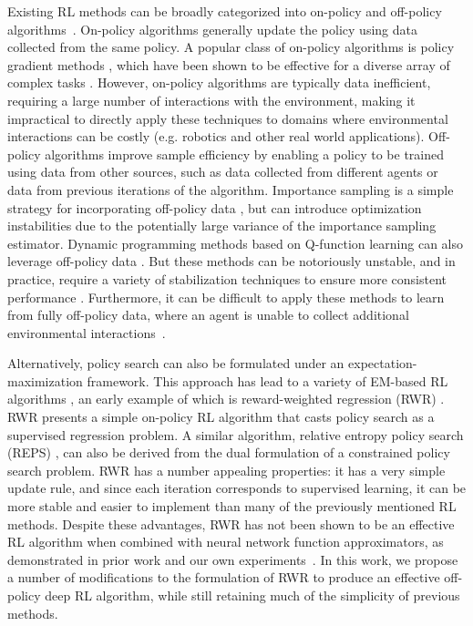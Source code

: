 \documentclass{article} \usepackage{iclr2020_conference,times}
\begin{document}
Existing RL methods can be broadly categorized into on-policy and off-policy algorithms~\citep{Sutton1998}. On-policy algorithms generally update the policy using data collected from the same policy. A popular class of on-policy algorithms is policy gradient methods \citep{Williams1992,PoliGrad1999}, which have been shown to be effective for a diverse array of complex tasks \citep{HeessTSLMWTEWER17,Pathak2017,2018-TOG-deepMimic,Rajeswaran-RSS-18}.
However, on-policy algorithms are typically data inefficient, requiring a large number of interactions with the environment, making it impractical to directly apply these techniques to domains where environmental interactions can be costly (e.g. robotics and other real world applications).
Off-policy algorithms improve sample efficiency by enabling a policy to be trained using data from other sources, such as data collected from different agents or data from previous iterations of the algorithm. Importance sampling is a simple strategy for incorporating off-policy data \citep{Sutton1998,Meuleau00off,Hachiya2009}, but can introduce optimization instabilities due to the potentially large variance of the importance sampling estimator. Dynamic programming methods based on Q-function learning can also leverage off-policy data \citep{Precup2001,mnih2015humanlevel,DDPG2016,NAF16,haarnoja18b}. But these methods can be notoriously unstable, and in practice, require a variety of stabilization techniques to ensure more consistent performance \citep{Hasselt2016,WangBHMMKF16,Munos2016,RainbowDQN2017,fujimoto18a,nachum2018learning,fu19diagnosing}. Furthermore, it can be difficult to apply these methods to learn from fully off-policy data, where an agent is unable to collect additional environmental interactions~\citep{fujimoto19offpolicy, BEAR2019}.

Alternatively, policy search can also be formulated under an expectation-maximization framework. This approach has lead to a variety of EM-based RL algorithms \citep{Peters2010REP,Neumann2011,abdolmaleki2018maximum}, an early example of which is reward-weighted regression (RWR) \citep{Peters2007RWR}. RWR presents a simple on-policy RL algorithm that casts policy search as a supervised regression problem.
A similar algorithm, relative entropy policy search (REPS) \citep{Peters2010REP}, can also be derived from the dual formulation of a constrained policy search problem. RWR has a number appealing properties: it has a very simple update rule, and  since each iteration corresponds to supervised learning, it can be more stable and easier to implement than many of the previously mentioned RL methods. 
Despite these advantages, RWR has not been shown to be an effective RL algorithm when combined with neural network function approximators, as demonstrated in prior work and our own experiments~\citep{TRPOschulman15,DuanCHSA16}. In this work, we propose a number of modifications to the formulation of RWR to produce an effective off-policy deep RL algorithm, while still retaining much of the simplicity of previous methods.
\end{document}
